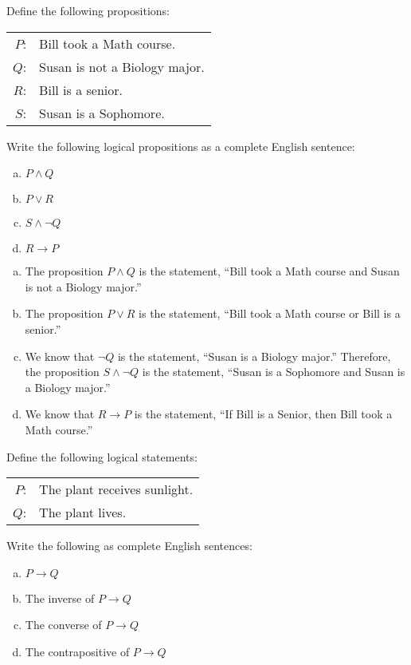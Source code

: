 \documentclass[11pt,letterpaper]{article}
\begin{document}

 Define the following propositions:
	\begin{table}[H]
	\centering
	\begin{tabular}{rl}
	$P$: & Bill took a Math course. \\
	$Q$: & Susan is not a Biology major. \\
	$R$: & Bill is a senior. \\
	$S$: & Susan is a Sophomore. 
	\end{tabular}
	\end{table}
Write the following logical propositions as a complete English sentence:
	\begin{enumerate}[(a)]
	\item $P \wedge Q$
	\item $P \vee R$
	\item $S \wedge \neg Q$
	\item $R \to P$
	\end{enumerate} \pspace

\sol 
\begin{enumerate}[(a)]
\item The proposition $P \wedge Q$ is the statement, ``Bill took a Math course and Susan is not a Biology major.'' \pspace

\item The proposition $P \vee R$ is the statement, ``Bill took a Math course or Bill is a senior.'' \pspace

\item We know that $\neg Q$ is the statement, ``Susan is a Biology major.'' Therefore, the proposition $S \wedge \neg Q$ is the statement, ``Susan is a Sophomore and Susan is a Biology major.'' \pspace

\item We know that $R \to P$ is the statement, ``If Bill is a Senior, then Bill took a Math course.'' 
\end{enumerate}



\newpage



 Define the following logical statements:
	\begin{table}[H]
	\centering
	\begin{tabular}{rl}
	$P$: & The plant receives sunlight. \\
	$Q$: & The plant lives. 
	\end{tabular}
	\end{table}
Write the following as complete English sentences: 
	\begin{enumerate}[(a)]
	\item $P \to Q$
	\item The inverse of $P \to Q$
	\item The converse of $P \to Q$
	\item The contrapositive of $P \to Q$
	\end{enumerate} \pspace
\end{document}
